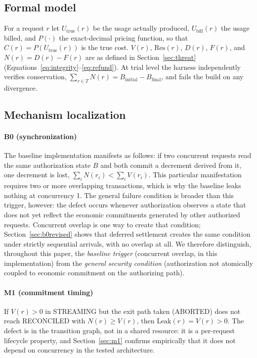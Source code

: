\documentclass[manuscript,review]{acmart}
\begin{document}
\subsection{Formal model}
For a request $r$ let $U_{\text{true}}(r)$ be the usage actually produced,
$U_{\text{bill}}(r)$ the usage billed, and $P(\cdot)$ the exact-decimal pricing function,
so that $C(r) = P(U_{\text{true}}(r))$ is the true cost. $V(r)$, $\mathrm{Res}(r)$,
$D(r)$, $F(r)$, and $N(r) = D(r) - F(r)$ are as defined in Section~\ref{sec:threat}
(Equations~\ref{eq:integrity}--\ref{eq:refund}). At trial level the harness independently
verifies conservation, $\sum_{r \in T} N(r) = B_{\text{initial}} - B_{\text{final}}$, and
fails the build on any divergence.

\subsection{Mechanism localization}
\paragraph{B0 (synchronization)}
The baseline implementation manifests as follows: if two concurrent requests read the
same authorization state $B$ and both commit a decrement derived from it, one decrement
is lost, $\sum_i N(r_i) < \sum_i V(r_i)$. This particular manifestation requires two or
more overlapping transactions, which is why the baseline leaks nothing at concurrency 1.
The general failure condition is broader than this trigger, however: the defect occurs
whenever authorization observes a state that does not yet reflect the economic
commitments generated by other authorized requests. Concurrent overlap is one way to
create that condition; Section~\ref{sec:b0revised} shows that deferred settlement creates
the same condition under strictly sequential arrivals, with no overlap at all. We
therefore distinguish, throughout this paper, the \emph{baseline trigger} (concurrent
overlap, in this implementation) from the \emph{general security condition}
(authorization not atomically coupled to economic commitment on the authorizing path).

\paragraph{M1 (commitment timing)}
If $V(r) > 0$ in STREAMING but the exit path taken (ABORTED) does not reach RECONCILED
with $N(r) \ge V(r)$, then $\mathrm{Leak}(r) = V(r) > 0$. The defect is in the transition
graph, not in a shared resource: it is a per-request lifecycle property, and
Section~\ref{sec:m1} confirms empirically that it does not depend on concurrency in the
tested architecture.
\end{document}
